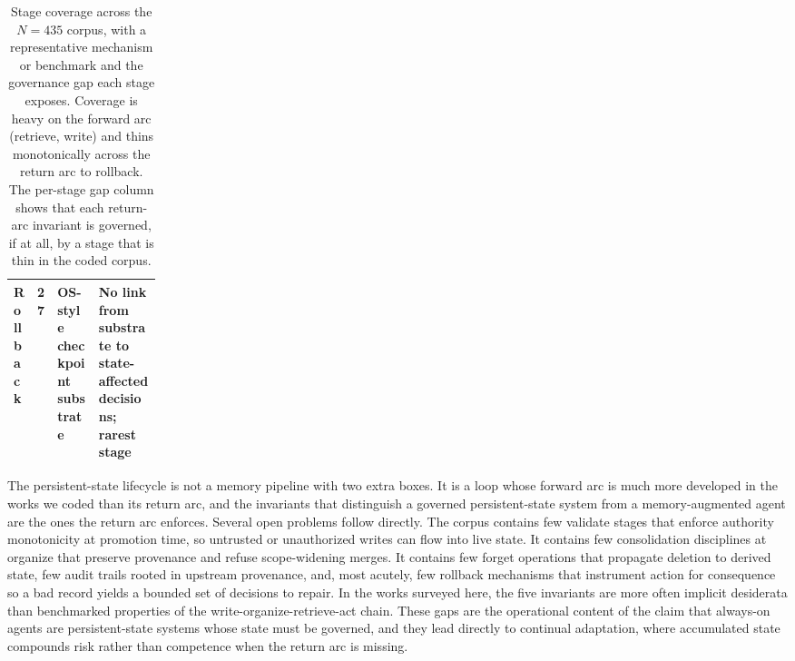 \begin{table}[t]
\begin{tabularx}{\linewidth}{p{0.13\linewidth}p{0.06\linewidth}YY}
Rollback & 27 & OS-style checkpoint substrate \citep{packer2024memgptllmsoperatingsystems,kang2025memoryosaiagent} & No link from substrate to state-affected decisions; rarest stage \\
\bottomrule
\end{tabularx}
\caption{Stage coverage across the $N{=}435$ corpus, with a representative mechanism or benchmark and the governance gap each stage exposes. Coverage is heavy on the forward arc (retrieve, write) and thins monotonically across the return arc to rollback. The per-stage gap column shows that each return-arc invariant is governed, if at all, by a stage that is thin in the coded corpus.}
\label{tab:stage-coverage}
\end{table}

The persistent-state lifecycle is not a memory pipeline with two extra boxes. It is a loop whose forward arc is much more developed in the works we coded than its return arc, and the invariants that distinguish a governed persistent-state system from a memory-augmented agent are the ones the return arc enforces. Several open problems follow directly. The corpus contains few validate stages that enforce authority monotonicity at promotion time, so untrusted or unauthorized writes can flow into live state. It contains few consolidation disciplines at organize that preserve provenance and refuse scope-widening merges. It contains few forget operations that propagate deletion to derived state, few audit trails rooted in upstream provenance, and, most acutely, few rollback mechanisms that instrument action for consequence so a bad record yields a bounded set of decisions to repair. In the works surveyed here, the five invariants are more often implicit desiderata than benchmarked properties of the write-organize-retrieve-act chain. These gaps are the operational content of the claim that always-on agents are persistent-state systems whose state must be governed, and they lead directly to continual adaptation, where accumulated state compounds risk rather than competence when the return arc is missing.
